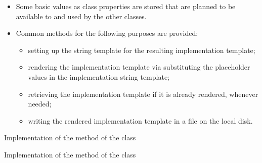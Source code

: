 \begin{itemize}
    \item Some basic values as class properties are stored that are planned to be available to and used by the other classes.

    \item Common methods for the following purposes are provided:

    \begin{itemize}
        \item 
        setting up the string template for the resulting implementation template;

        \item
        rendering the implementation template via substituting the placeholder values in the implementation string template;

        \item
        retrieving the implementation template if it is already rendered, whenever needed;

        \item
        writing the rendered implementation template in a file on the local disk.
    \end{itemize}
\end{itemize}

\begin{listing}
    \caption{Implementation of the  method of the  class}
    \label{lst: mago-ag thing set_implementation_template}
\end{listing}

\begin{listing}
    \caption{Implementation of the  method of the  class}
    \label{lst: mago-ag thing render_implementation}
\end{listing}

